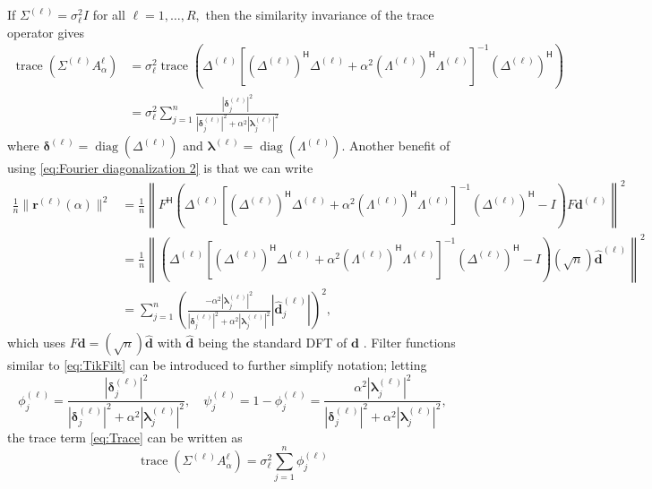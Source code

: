 \documentclass[12pt]{article}
\newcommand{\dVec}{\mathbf{d}}	%
\newcommand{\rVec}{\mathbf{r}}	%
\newcommand{\ctrans}[1]{{#1}^\mathsf{H}}	%
\DeclareMathOperator{\trace}{trace}		%
\DeclareMathOperator{\diag}{diag}	%
\newcommand{\dft}[1]{\widehat{#1}}	%
\newcommand{\regparam}{\alpha}
\newcommand{\filt}{\phi}
\newcommand{\mfilt}{\psi}
\newcommand{\noiseSD}{\sigma}	%
\newcommand{\A}{A_{\regparam}}	%
\begin{document}
If $\Sigma^{(\ell)} = \noiseSD_\ell^2I$ for all $\ell = 1,\ldots,R,$ then the similarity invariance of the trace operator gives
\begin{align}
\trace\left(\Sigma^{(\ell)}\A^{\ell}\right) &= \noiseSD_\ell^2 \trace\left(\Delta^{(\ell)}\left[\ctrans{(\Delta^{(\ell)})}\Delta^{(\ell)} + \regparam^2\ctrans{(\Lambda^{(\ell)})}\Lambda^{(\ell)}\right]^{-1}\ctrans{(\Delta^{(\ell)})}\right) \nonumber \\
&= \noiseSD_\ell^2 \sum_{j=1}^{n} \frac{|\bm{\delta}_j^{(\ell)}|^2}{|\bm{\delta}_j^{(\ell)}|^2 + \regparam^2 |\bm{\lambda}_j^{(\ell)}|^2}
\label{eq:Trace}
\end{align}
where $\bm{\delta}^{(\ell)} = \diag(\Delta^{(\ell)})$ and $\bm{\lambda}^{(\ell)} = \diag(\Lambda^{(\ell)})$. Another benefit of using \eqref{eq:Fourier diagonalization 2} is that we can write
\begin{align}
\frac{1}{n}\|\rVec^{(\ell)}(\regparam)\|^2 &= \frac{1}{n}\left\|\ctrans{F}\left(\Delta^{(\ell)}\left[\ctrans{(\Delta^{(\ell)})}\Delta^{(\ell)} + \regparam^2\ctrans{(\Lambda^{(\ell)})}\Lambda^{(\ell)}\right]^{-1}\ctrans{(\Delta^{(\ell)})} - I\right)F\dVec^{(\ell)}\right\|^2 \nonumber \\
&= \frac{1}{n}\left\|\left(\Delta^{(\ell)}\left[\ctrans{(\Delta^{(\ell)})}\Delta^{(\ell)} + \regparam^2\ctrans{(\Lambda^{(\ell)})}\Lambda^{(\ell)}\right]^{-1}\ctrans{(\Delta^{(\ell)})} - I\right)\left(\sqrt{n}\right)\dft{\dVec}^{(\ell)}\right\|^2 \nonumber \\
&= \sum_{j=1}^{n} \left(\frac{-\regparam^2|\bm{\lambda}_j^{(\ell)}|^2}{|\bm{\delta}_j^{(\ell)}|^2 + \regparam^2|\bm{\lambda}_j^{(\ell)}|^2}|\dft{\dVec}_j^{(\ell)}|\right)^2,
\label{eq:Fourier regularized residual}
\end{align}
which uses $F\dVec = (\sqrt{n})\dft{\dVec}$ with $\dft{\dVec}$ being the standard DFT of $\dVec$ \cite{Vogel:2002}. Filter functions similar to \eqref{eq:TikFilt} can be introduced to further simplify notation; letting
\begin{equation}
\label{eq:Filter functions}
\filt_j^{(\ell)} = \frac{|\bm{\delta}_j^{(\ell)}|^2}{|\bm{\delta}_j^{(\ell)}|^2 + \regparam^2 |\bm{\lambda}_j^{(\ell)}|^2}, \quad \mfilt_j^{(\ell)} = 1 - \filt_j^{(\ell)} = \frac{\regparam^2|\bm{\lambda}_j^{(\ell)}|^2}{|\bm{\delta}_j^{(\ell)}|^2 + \regparam^2 |\bm{\lambda}_j^{(\ell)}|^2},
\end{equation}
the trace term \eqref{eq:Trace} can be written as
\begin{equation}
\label{eq:Trace filter}
\trace\left(\Sigma^{(\ell)}\A^{\ell}\right) = \noiseSD_\ell^2 \sum_{j=1}^{n} \filt_j^{(\ell)}
\end{equation}
\end{document}
